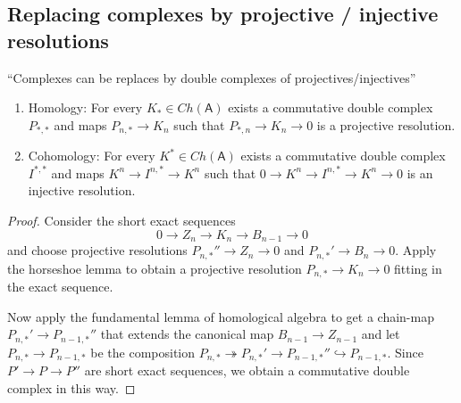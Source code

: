 \documentclass[fontsize=11pt,fleqn,a4paper]{scrartcl}
\begin{document}
\subsection{Replacing complexes by projective / injective resolutions}

\begin{corollary}
\enquote{Complexes can be replaces by double complexes of projectives/injectives}
\begin{multicols}{2}
\begin{enumerate}
\item Homology: For every $K_\ast\in Ch(\mathsf{A})$ exists a commutative double complex $P_{\ast,\ast}$ and maps $P_{n,\ast}\to K_n$ such that $P_{\ast,n} \to K_n \to 0$ is a projective resolution.
\item Cohomology: For every $K^\ast\in Ch(\mathsf{A})$ exists a commutative double complex $I^{\ast,\ast}$ and maps $K^n\to I^{n,\ast}\to K^n$ such that $0\to K^n\to I^{n,\ast} \to K^n \to 0$ is an injective resolution.
\end{enumerate}
\end{multicols}
\end{corollary}
\begin{proof}
Consider the short exact sequences
\[0\to Z_n \to K_n \to B_{n-1}\to 0\]
and choose projective resolutions $P_{n,\ast}''\to Z_n\to 0$ and $P_{n,\ast}'\to B_n\to 0$. Apply the horseshoe lemma to obtain a projective resolution $P_{n,\ast}\to K_n\to 0$ fitting in the exact sequence.

Now apply the fundamental lemma of homological algebra to get a chain-map  $P_{n,\ast}' \to P_{n-1,\ast}''$ that extends the canonical map $B_{n-1} \to Z_{n-1}$ and let $P_{n,\ast} \to P_{n-1,\ast}$ be the composition $P_{n,\ast} \twoheadrightarrow P_{n,\ast}' \to P_{n-1,\ast}'' \hookrightarrow P_{n-1,\ast}$. Since $P' \to P \to P''$ are short exact sequences, we obtain a commutative double complex in this way.
\end{proof}
\end{document}
